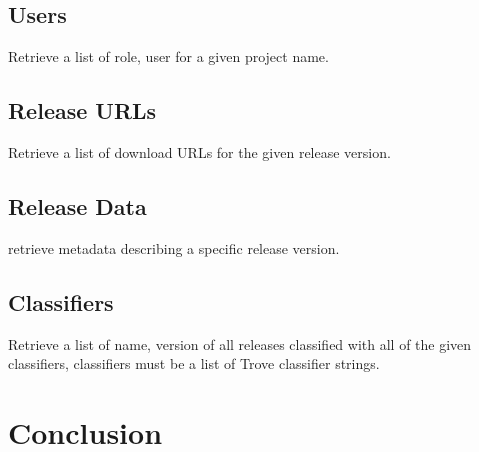 \documentclass[a4paper,12pt]{article}
\begin{document}
\subsection{Users}
Retrieve a list of role, user for a given project name.
\subsection{Release URLs}
Retrieve a list of download URLs for the given release version.
\subsection{Release Data}
retrieve metadata describing a specific release version.
\subsection{Classifiers}
Retrieve a list of name, version of all releases classified with all of the given classifiers, classifiers must be a list of Trove classifier strings.
\section{Conclusion}

\begin{thebibliography}{69}
\end{thebibliography}
\end{document}

